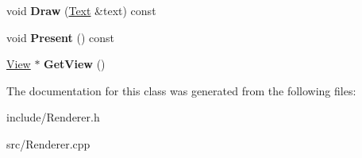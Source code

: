 \begin{DoxyCompactItemize}
\item 
\hypertarget{classsdl_1_1Renderer_a3a8c3aac899d33f7d634e75cbf902a61}{void {\bfseries Draw} (\hyperlink{classsdl_1_1Text}{Text} \&text) const }\label{classsdl_1_1Renderer_a3a8c3aac899d33f7d634e75cbf902a61}

\item 
\hypertarget{classsdl_1_1Renderer_af1874215eca9f9067e4ff373c7929d0c}{void {\bfseries Present} () const }\label{classsdl_1_1Renderer_af1874215eca9f9067e4ff373c7929d0c}

\item 
\hypertarget{classsdl_1_1Renderer_abc551ccdd5fd854454269c24fb404182}{\hyperlink{classsdl_1_1View}{View} $\ast$ {\bfseries Get\-View} ()}\label{classsdl_1_1Renderer_abc551ccdd5fd854454269c24fb404182}

\end{DoxyCompactItemize}


The documentation for this class was generated from the following files\-:\begin{DoxyCompactItemize}
\item 
include/Renderer.\-h\item 
src/Renderer.\-cpp\end{DoxyCompactItemize}

